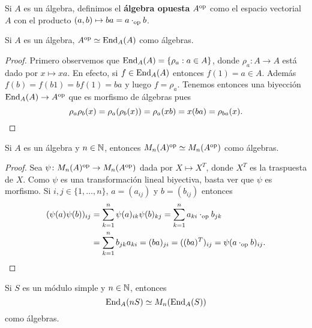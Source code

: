 
Si $A$ es un álgebra, definimos el \textbf{álgebra opuesta} $A^{\operatorname{op}}$ como
el espacio vectorial $A$ con el producto $(a,b)\mapsto ba=a\cdot_{\operatorname{op}}b$. 

\begin{lemma}
	\label{lem:A^op}
    Si $A$ es un álgebra, $A^{\operatorname{op}}\simeq\operatorname{End}_A(A)$ como álgebras. 
\end{lemma}

\begin{proof}
	Primero observemos que $\operatorname{End}_A(A)=\{\rho_a:a\in A\}$, donde $\rho_a\colon
	A\to A$ está dado por $x\mapsto xa$. En efecto, si $f\in\operatorname{End}_A(A)$
	entonces $f(1)=a\in A$. Además $f(b)=f(b1)=bf(1)=ba$ y luego
	$f=\rho_a$.  Tenemos entonces una biyección $\operatorname{End}_A(A)\to A^{\operatorname{op}}$ que es
	morfismo de álgebras pues 
    \[
		\rho_a\rho_b(x)=\rho_a(\rho_b(x))=\rho_a(xb)=x(ba)=\rho_{ba}(x).\qedhere
    \]
\end{proof}

\begin{lemma}
	\label{lem:Mn_op}
	Si $A$ es un álgebra y $n\in\mathbb{N}$, entonces $M_n(A)^{\operatorname{op}}\simeq
	M_n(A^{\operatorname{op}})$ como álgebras.   
\end{lemma}

\begin{proof}
	Sea $\psi\colon M_n(A)^{\operatorname{op}}\to M_n(A^{\operatorname{op}})$ dada por $X\mapsto X^T$,
	donde $X^T$ es la traspuesta de $X$. Como $\psi$ es una transformación lineal biyectiva, basta
	ver
	que $\psi$ es morfismo. Si $i,j\in\{1,\dots,n\}$, $a=(a_{ij})$ y $b=(b_{ij})$ entonces
	\begin{align*}
		(\psi(a)\psi(b))_{ij}&=\sum_{k=1}^n \psi(a)_{ik}\psi(b)_{kj}=\sum_{k=1}^n a_{ki}\cdot_{\operatorname{op}}b_{jk}\\
		&=\sum_{k=1}^n b_{jk}a_{ki}=(ba)_{ji}=((ba)^T)_{ij}=\psi(a\cdot_{\operatorname{op}}b)_{ij}.\qedhere
	\end{align*}
\end{proof}

\begin{lemma}
	\label{lem:simple}
	Si $S$ es un módulo simple y $n\in\mathbb{N}$, entonces 
	\[
		\operatorname{End}_A(nS)\simeq M_n(\operatorname{End}_A(S))
	\]
	como álgebras.
\end{lemma}

